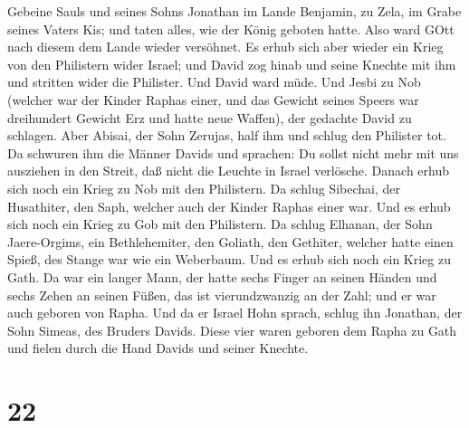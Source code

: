 Gebeine Sauls und seines Sohns Jonathan im Lande Benjamin, zu Zela, im
Grabe seines Vaters Kis; und taten alles, wie der König geboten hatte.
Also ward GOtt nach diesem dem Lande wieder versöhnet.  Es
erhub sich aber wieder ein Krieg von den Philistern wider Israel; und
David zog hinab und seine Knechte mit ihm und stritten wider die
Philister. Und David ward müde.  Und Jesbi zu Nob (welcher
war der Kinder Raphas einer, und das Gewicht seines Speers war
dreihundert Gewicht Erz und hatte neue Waffen), der gedachte David zu
schlagen.  Aber Abisai, der Sohn Zerujas, half ihm und
schlug den Philister tot. Da schwuren ihm die Männer Davids und
sprachen: Du sollst nicht mehr mit uns ausziehen in den Streit, daß
nicht die Leuchte in Israel verlösche.  Danach erhub sich
noch ein Krieg zu Nob mit den Philistern. Da schlug Sibechai, der
Husathiter, den Saph, welcher auch der Kinder Raphas einer war.
 Und es erhub sich noch ein Krieg zu Gob mit den
Philistern. Da schlug Elhanan, der Sohn Jaere-Orgims, ein Bethlehemiter,
den Goliath, den Gethiter, welcher hatte einen Spieß, des Stange war wie
ein Weberbaum.  Und es erhub sich noch ein Krieg zu Gath.
Da war ein langer Mann, der hatte sechs Finger an seinen Händen und
sechs Zehen an seinen Füßen, das ist vierundzwanzig an der Zahl; und er
war auch geboren von Rapha.  Und da er Israel Hohn sprach,
schlug ihn Jonathan, der Sohn Simeas, des Bruders Davids. 
Diese vier waren geboren dem Rapha zu Gath und fielen durch die Hand
Davids und seiner Knechte.

\hypertarget{section-21}{%
\section{22}\label{section-21}}

